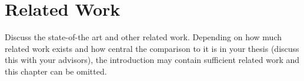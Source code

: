 \chapter{Related Work}
\label{ch:related_work}

Discuss the state-of-the art and other related work.
Depending on how much related work exists and how central the comparison to it is in your thesis (discuss this with your advisors), the introduction may contain sufficient related work and this chapter can be omitted.
